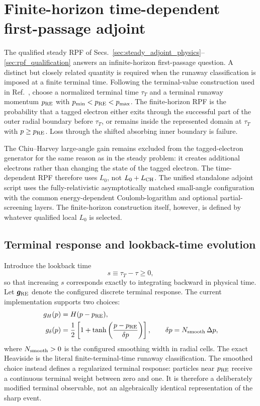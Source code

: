 \documentclass[11pt]{article}
\begin{document}
\section{Finite-horizon time-dependent first-passage adjoint}
\label{sec:time_dependent_adjoint}

The qualified steady RPF of Secs.~\ref{sec:steady_adjoint_physics}--\ref{sec:rpf_qualification}
answers an infinite-horizon first-passage question.  A distinct but closely related
quantity is required when the runaway classification is imposed at a finite terminal
time.  Following the terminal-value construction used in
Ref.~\cite{McDevitt2025Dynamics}, choose a normalized terminal time $\tau_T$ and a
terminal runaway momentum $p_{\rm RE}$ with
$p_{\min}<p_{\rm RE}<p_{\max}$.  The finite-horizon RPF is the probability that a tagged
electron either exits through the successful part of the outer radial boundary before
$\tau_T$, or remains inside the represented domain at $\tau_T$ with
$p\ge p_{\rm RE}$.  Loss through the shifted absorbing inner boundary is failure.

The Chiu--Harvey large-angle gain remains excluded from the tagged-electron generator
for the same reason as in the steady problem: it creates additional electrons rather
than changing the state of the tagged electron.  The time-dependent RPF therefore uses
$L_0$, not $L_0+L_{\rm CH}$.  The unified standalone adjoint script uses the fully-relativistic asymptotically matched
small-angle configuration with the common energy-dependent Coulomb-logarithm and optional
partial-screening layers.  The finite-horizon construction itself, however, is defined by
whatever qualified local $L_0$ is selected.

\subsection{Terminal response and lookback-time evolution}
\label{sec:time_adjoint_terminal}

Introduce the lookback time
\begin{equation}
 s\equiv \tau_T-\tau\ge0,
 \label{eq:rpf_lookback_time}
\end{equation}
so that increasing $s$ corresponds exactly to integrating backward in physical time.
Let $\bm g_{\rm RE}$ denote the configured discrete terminal response.  The current
implementation supports two choices:
\begin{align}
 g_H(p) &= H(p-p_{\rm RE}),
 \label{eq:time_rpf_terminal_heaviside}\\
 g_\delta(p) &= \frac12\left[1+\tanh\left(\frac{p-p_{\rm RE}}{\delta p}\right)\right],
 \qquad \delta p=N_{\rm smooth}\,\Delta p,
 \label{eq:time_rpf_terminal_smooth}
\end{align}
where $N_{\rm smooth}>0$ is the configured smoothing width in radial cells.  The exact
Heaviside is the literal finite-terminal-time runaway classification.  The smoothed choice
instead defines a regularized terminal response: particles near $p_{\rm RE}$ receive a
continuous terminal weight between zero and one.  It is therefore a deliberately modified
terminal observable, not an algebraically identical representation of the sharp event.
\end{document}
